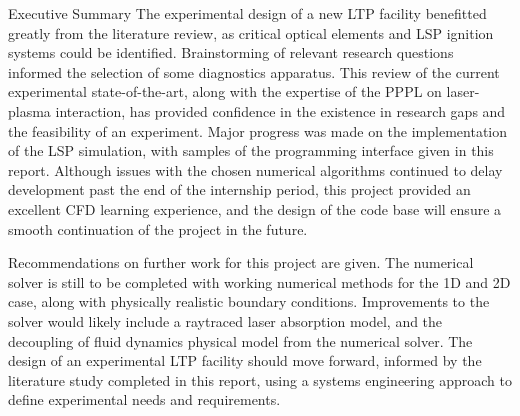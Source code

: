\begin{plainchp}{Executive Summary}
    The experimental design of a new LTP facility benefitted greatly from the literature review, as critical optical elements and LSP ignition systems could be identified. Brainstorming of relevant research questions informed the selection of some diagnostics apparatus. This review of the current experimental state-of-the-art, along with the expertise of the PPPL on laser-plasma interaction, has provided confidence in the existence in research gaps and the feasibility of an experiment. Major progress was made on the implementation of the LSP simulation, with samples of the programming interface given in this report. Although issues with the chosen numerical algorithms continued to delay development past the end of the internship period, this project provided an excellent CFD learning experience, and the design of the code base will ensure a smooth continuation of the project in the future.

    Recommendations on further work for this project are given. The numerical solver is still to be completed with working numerical methods for the 1D and 2D case, along with physically realistic boundary conditions. Improvements to the solver would likely include a raytraced laser absorption model, and the decoupling of fluid dynamics physical model from the numerical solver. The design of an experimental LTP facility should move forward, informed by the literature study completed in this report, using a systems engineering approach to define experimental needs and requirements.

\end{plainchp}